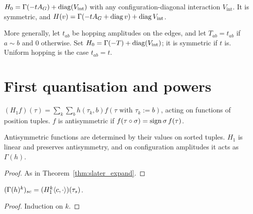 \begin{definition}
  \label{def:H0F}
  \leanok
  $H_0=\Gamma(-tA_G)+\operatorname{diag}(V_{\mathrm{int}})$ with any configuration-diagonal interaction $V_{\mathrm{int}}$.
  It is symmetric, and $H(v)=\Gamma(-tA_G+\operatorname{diag} v)+\operatorname{diag} V_{\mathrm{int}}$.
\end{definition}

\begin{definition}
  \label{def:H0Fw}
  \leanok
  More generally, let $t_{ab}$ be hopping amplitudes on the edges, and let $T_{ab}=t_{ab}$ if $a\sim b$ and
  $0$ otherwise. Set $H_0=\Gamma(-T)+\operatorname{diag}(V_{\mathrm{int}})$; it is symmetric if $t$ is. Uniform hopping is
  the case $t_{ab}=t$.
\end{definition}

\section{First quantisation and powers}

\begin{definition}
  \label{def:H1}
  \leanok
  $(H_1f)(\tau)=\sum_k\sum_bh(\tau_k,b)f(\tau\text{ with }\tau_k:=b)$, acting on functions of position tuples.
  $f$ is antisymmetric if $f(\tau\circ\sigma)=\operatorname{sign}\sigma\, f(\tau)$.
\end{definition}

\begin{lemma}
  \label{lem:H1_props}
  \leanok
  Antisymmetric functions are determined by their values on sorted tuples. $H_1$ is linear and preserves
  antisymmetry, and on configuration amplitudes it acts as $\Gamma(h)$.
\end{lemma}
\begin{proof}
  \leanok
  As in Theorem~\ref{thm:slater_expand}.
\end{proof}

\begin{theorem}
  \label{thm:gamma_pow_apply}
  \leanok
  $(\Gamma(h)^k)_{sc}=(H_1^k\langle c, \cdot\rangle)(\tau_s)$.
\end{theorem}
\begin{proof}
  \leanok
  Induction on $k$.
\end{proof}


